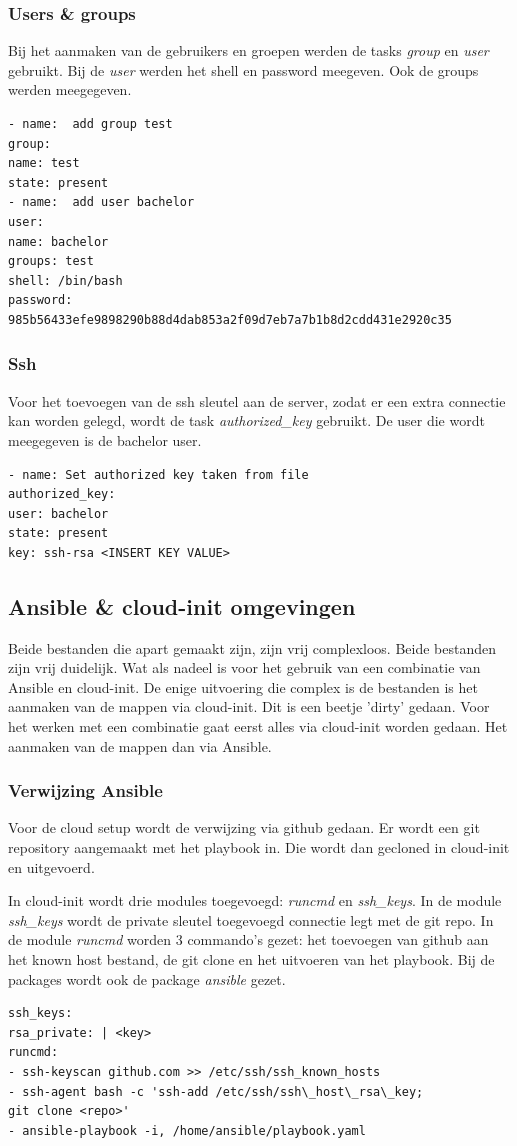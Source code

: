 \subsubsection{Users \& groups}
Bij het aanmaken van de gebruikers en groepen werden de tasks \textit{group} en \textit{user} gebruikt. Bij de \textit{user} werden het shell en password meegeven. Ook de groups werden meegegeven.
\begin{lstlisting}[basicstyle=\small]
- name:  add group test
group:
name: test
state: present
- name:  add user bachelor
user:
name: bachelor
groups: test
shell: /bin/bash
password: 985b56433efe9898290b88d4dab853a2f09d7eb7a7b1b8d2cdd431e2920c35
\end{lstlisting}

\subsubsection{Ssh}
Voor het toevoegen van de ssh sleutel aan de server, zodat er een extra connectie kan worden gelegd, wordt de task \textit{authorized\_key} gebruikt. De user die wordt meegegeven is de bachelor user.
\begin{lstlisting}[basicstyle=\small]
- name: Set authorized key taken from file
authorized_key:
user: bachelor
state: present
key: ssh-rsa <INSERT KEY VALUE>

\end{lstlisting}

\subsection{Ansible \& cloud-init omgevingen}
Beide bestanden die apart gemaakt zijn, zijn vrij complexloos. Beide bestanden zijn vrij duidelijk. Wat als nadeel is voor het gebruik van een combinatie van Ansible en cloud-init. De enige uitvoering die complex is de bestanden is het aanmaken van de mappen via cloud-init. Dit is een beetje 'dirty' gedaan. Voor het werken met een combinatie gaat eerst alles via cloud-init worden gedaan. Het aanmaken van de mappen dan via Ansible.

\subsubsection{Verwijzing Ansible}
Voor de cloud setup wordt de verwijzing via github gedaan. Er wordt een git repository aangemaakt met het playbook in. Die wordt dan gecloned in cloud-init en uitgevoerd.

In cloud-init wordt drie modules toegevoegd: \textit{runcmd} en \textit{ssh\_keys}. In de module \textit{ssh\_keys} wordt de private sleutel toegevoegd connectie legt met de git repo. In de module \textit{runcmd} worden 3 commando's gezet: het toevoegen van github aan het known host bestand, de git clone en het uitvoeren van het playbook. Bij de packages wordt ook de package \textit{ansible} gezet.
\begin{lstlisting}[basicstyle=\small]
ssh_keys:
rsa_private: | <key>
runcmd:
- ssh-keyscan github.com >> /etc/ssh/ssh_known_hosts
- ssh-agent bash -c 'ssh-add /etc/ssh/ssh\_host\_rsa\_key; 
git clone <repo>'
- ansible-playbook -i, /home/ansible/playbook.yaml
\end{lstlisting}


